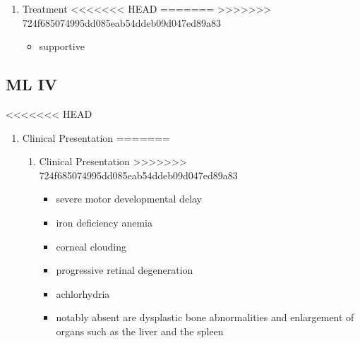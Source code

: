 \documentclass[fontsize=12pt]{scrartcl}
\begin{document}
\begin{enumerate}
\begin{enumerate}
\begin{enumerate}
\begin{enumerate}
\begin{table}[htbp]
\begin{enumerate}
\begin{enumerate}
\begin{enumerate}
\begin{enumerate}
\begin{enumerate}
\begin{enumerate}
\begin{enumerate}
\item Treatment
<<<<<<< HEAD
\label{sec:org97e2b43}
=======
\label{sec:org75fb8b5}
>>>>>>> 724f685074995dd085eab54ddeb09d047ed89a83
\begin{itemize}
\item supportive
\end{itemize}
\end{enumerate}
\subsection{ML IV}
<<<<<<< HEAD
\label{sec:orgb0b4914}
\begin{enumerate}
\item Clinical Presentation
\label{sec:orgfc955ff}
=======
\label{sec:orgf1ba91b}
\begin{enumerate}
\item Clinical Presentation
\label{sec:org9c00a1f}
>>>>>>> 724f685074995dd085eab54ddeb09d047ed89a83
\begin{itemize}
\item severe motor developmental delay
\item iron deficiency anemia
\item corneal clouding
\item progressive retinal degeneration
\item achlorhydria
\end{itemize}
\begin{itemize}
\item notably absent are dysplastic bone abnormalities and enlargement of
organs such as the liver and the spleen
\end{itemize}


\end{enumerate}
\end{enumerate}
\end{enumerate}
\end{enumerate}
\end{enumerate}
\end{enumerate}
\end{enumerate}
\end{enumerate}
\end{table}
\end{enumerate}
\end{enumerate}
\end{enumerate}
\end{enumerate}
\end{document}
